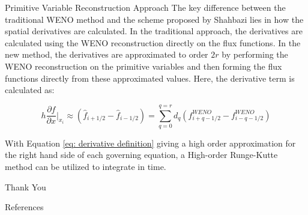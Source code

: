 \documentclass[9pt]{beamer}
\begin{document}
\begin{frame}{Primitive Variable Reconstruction Approach}
The key difference between the traditional WENO method and the scheme proposed by Shahbazi \cite{Shahbazi} lies in how the spatial derivatives are calculated.  In the traditional approach, the derivatives are calculated using the WENO reconstruction directly on the flux functions.   In the new method, the derivatives are approximated to order $2r$ by performing the WENO reconstruction on the primitive variables and then forming the flux functions directly from these approximated values.  Here, the derivative term is calculated as:     

\begin{equation}
h\frac{\partial f}{\partial x}\bigg|_{x_i}\approx (\hat{f}_{i+1/2}-\hat{f}_{i-1/2}) = \sum_{q=0}^{q=r}d_q(f^{WENO}_{i+q-1/2}-f^{WENO}_{i-q-1/2})
\label{eq: derivative definition}
\end{equation}  

With Equation \ref{eq: derivative definition} giving a high order approximation for the right hand side of each governing equation, a High-order Runge-Kutte method can be utilized to integrate in time. 

\end{frame}


\begin{frame}[standout]
  Thank You
\end{frame}

\appendix

\begin{frame}[allowframebreaks]{References}

  
  

\end{frame}
\end{document}
